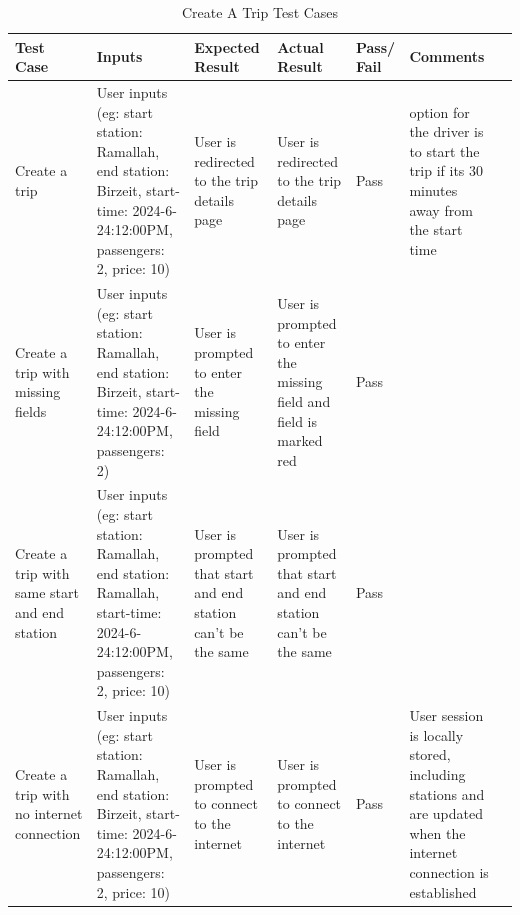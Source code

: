 \documentclass[a4paper, 12pt]{report} %
\begin{document}
                \begin{spacing}{1}
                    \begin{table}[H]
                        \centering
                        \label{tab:login_test}
                        \begin{tabularx}{\linewidth}{| R{2cm}|R{3cm}|R{2cm}|R{2cm}|R{2cm}|R{2cm}|R{2cm}|}
                            \hline
                             \textbf{Test Case} & \textbf{Inputs} & \textbf{Expected Result} & \textbf{Actual Result} & \textbf{Pass/ Fail} & \textbf{Comments} \\
                            \hline
                            Create a trip & User inputs (eg: start station: Ramallah, end station: Birzeit, start-time: 2024-6-24:12:00PM, passengers: 2, price: 10) & User is redirected to the trip details page & User is redirected to the trip details page & Pass & option for the driver is to start the trip if its 30 minutes away from the start time\\
                            \hline
                            Create a trip with missing fields & User inputs (eg: start station: Ramallah, end station: Birzeit, start-time: 2024-6-24:12:00PM, passengers: 2) & User is prompted to enter the missing field & User is prompted to enter the missing field and field is marked red & Pass & \\
                            \hline
                            Create a trip with same start and end station & User inputs (eg: start station: Ramallah, end station: Ramallah, start-time: 2024-6-24:12:00PM, passengers: 2, price: 10) & User is prompted that start and end station can't be the same & User is prompted that start and end station can't be the same & Pass & \\
                            \hline
                            Create a trip with no internet connection & User inputs (eg: start station: Ramallah, end station: Birzeit, start-time: 2024-6-24:12:00PM, passengers: 2, price: 10) & User is prompted to connect to the internet & User is prompted to connect to the internet & Pass & User session is locally stored, including stations and are updated when the internet connection is established\\
                            \hline
                        \end{tabularx}
                        \caption{Create A Trip Test Cases}
                    \end{table}
                \end{spacing}
\end{document}
